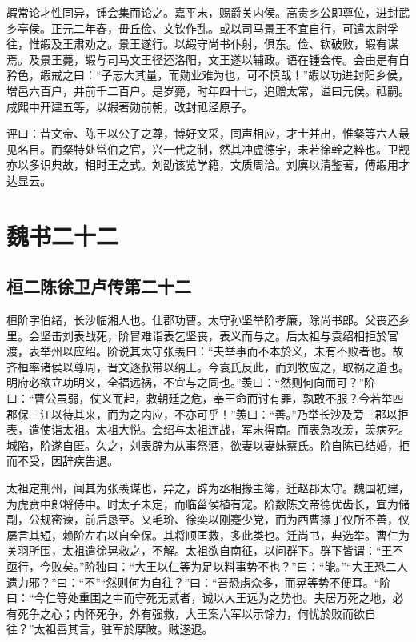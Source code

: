 \documentclass[12pt,UTF8]{ctexbook}
\begin{document}
嘏常论才性同异，锺会集而论之。嘉平末，赐爵关内侯。高贵乡公即尊位，进封武乡亭侯。正元二年春，毌丘俭、文钦作乱。或以司马景王不宜自行，可遣太尉孚往，惟嘏及王肃劝之。景王遂行。以嘏守尚书仆射，俱东。俭、钦破败，嘏有谋焉。及景王薨，嘏与司马文王径还洛阳，文王遂以辅政。语在锺会传。会由是有自矜色，嘏戒之曰：“子志大其量，而勋业难为也，可不慎哉！”嘏以功进封阳乡侯，增邑六百户，并前千二百户。是岁薨，时年四十七，追赠太常，谥曰元侯。祗嗣。咸熙中开建五等，以嘏著勋前朝，改封祗泾原子。

评曰：昔文帝、陈王以公子之尊，博好文采，同声相应，才士并出，惟粲等六人最见名目。而粲特处常伯之官，兴一代之制，然其冲虚德宇，未若徐幹之粹也。卫觊亦以多识典故，相时王之式。刘劭该览学籍，文质周洽。刘廙以清鉴著，傅嘏用才达显云。


\part{魏书二十二}
\chapter{桓二陈徐卫卢传第二十二}

桓阶字伯绪，长沙临湘人也。仕郡功曹。太守孙坚举阶孝廉，除尚书郎。父丧还乡里。会坚击刘表战死，阶冒难诣表乞坚丧，表义而与之。后太祖与袁绍相拒於官渡，表举州以应绍。阶说其太守张羡曰：“夫举事而不本於义，未有不败者也。故齐桓率诸侯以尊周，晋文逐叔带以纳王。今袁氏反此，而刘牧应之，取祸之道也。明府必欲立功明义，全福远祸，不宜与之同也。”羡曰：“然则何向而可？”阶曰：“曹公虽弱，仗义而起，救朝廷之危，奉王命而讨有罪，孰敢不服？今若举四郡保三江以待其来，而为之内应，不亦可乎！”羡曰：“善。”乃举长沙及旁三郡以拒表，遣使诣太祖。太祖大悦。会绍与太祖连战，军未得南。而表急攻羡，羡病死。城陷，阶遂自匿。久之，刘表辟为从事祭酒，欲妻以妻妹蔡氏。阶自陈已结婚，拒而不受，因辞疾告退。

太祖定荆州，闻其为张羡谋也，异之，辟为丞相掾主簿，迁赵郡太守。魏国初建，为虎贲中郎将侍中。时太子未定，而临菑侯植有宠。阶数陈文帝德优齿长，宜为储副，公规密谏，前后恳至。又毛玠、徐奕以刚蹇少党，而为西曹掾丁仪所不善，仪屡言其短，赖阶左右以自全保。其将顺匡救，多此类也。迁尚书，典选举。曹仁为关羽所围，太祖遣徐晃救之，不解。太祖欲自南征，以问群下。群下皆谓：“王不亟行，今败矣。”阶独曰：“大王以仁等为足以料事势不也？”曰：“能。”“大王恐二人遗力邪？”曰：“不”“然则何为自往？”曰：“吾恐虏众多，而晃等势不便耳。“阶曰：“今仁等处重围之中而守死无贰者，诚以大王远为之势也。夫居万死之地，必有死争之心；内怀死争，外有强救，大王案六军以示馀力，何忧於败而欲自往？”太祖善其言，驻军於摩陂。贼遂退。
\end{document}
